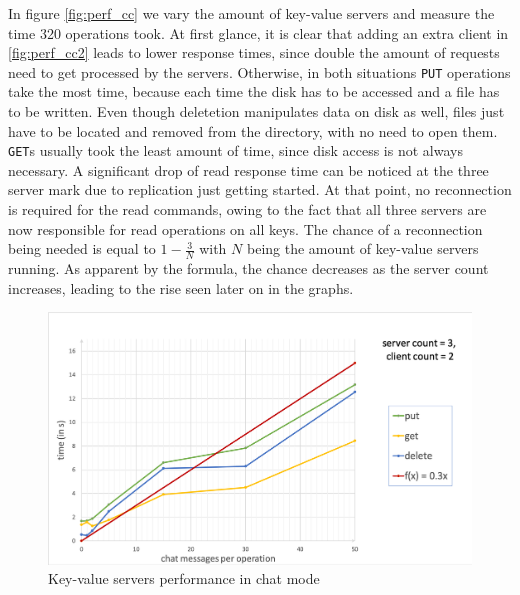 In figure \ref{fig:perf_cc}  we vary the amount of key-value servers and measure the time 320 operations took. At first glance, it is clear that adding an extra client in \ref{fig:perf_cc2} leads to lower response times, since double the amount of requests need to get processed by the servers. Otherwise, in both situations \texttt{PUT} operations take the most time, because each time the disk has to be accessed and a file has to be written. Even though deletetion manipulates data on disk as well, files just have to be located and removed from the directory, with no need to open them. \texttt{GET}s usually took the least amount of time, since disk access is not always necessary. %
A significant drop of read response time can be noticed at the three server mark due to replication just getting started. At that point, no reconnection is required for the read commands, owing to the fact that all three servers are now responsible for read operations on all keys. The chance of a reconnection being needed is equal to \begin{math}1-\frac{3}{N}\end{math} with \begin{math}N\end{math} being the amount of key-value servers running. As apparent by the formula, the chance decreases as the server count increases, leading to the rise seen later on in the graphs. 


\begin{figure}[h]
	\centering
	\includegraphics[width=0.8\linewidth]{figures/performance/chat(linear).png}
	\caption{Key-value servers performance in chat mode}
	\label{fig:perf_chat_lin}
\end{figure}

